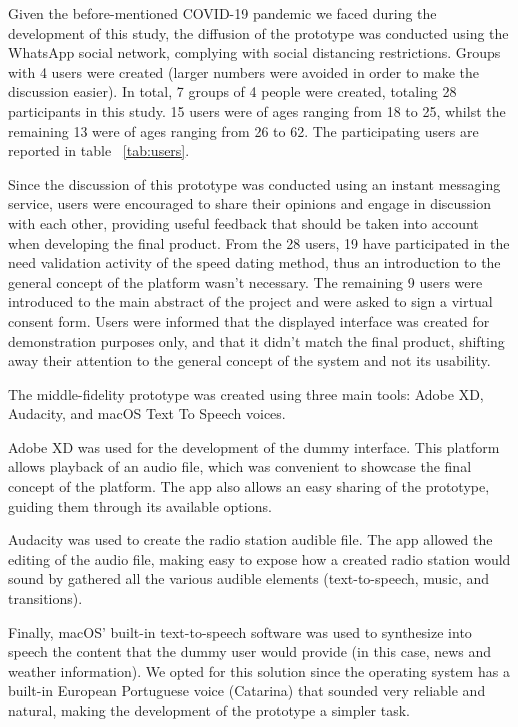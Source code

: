 Given the before-mentioned COVID-19 pandemic we faced during the development of this study, the diffusion of the prototype was conducted using the WhatsApp social network, complying with social distancing restrictions. Groups with 4 users were created (larger numbers were avoided in order to make the discussion easier). In total, 7 groups of 4 people were created, totaling 28 participants in this study. 15 users were of ages ranging from 18 to 25, whilst the remaining 13 were of ages ranging from 26 to 62. The participating users are reported in table ~\ref{tab:users}.

Since the discussion of this prototype was conducted using an instant messaging service, users were encouraged to share their opinions and engage in discussion with each other, providing useful feedback that should be taken into account when developing the final product. From the 28 users, 19 have participated in the need validation activity of the speed dating method, thus an introduction to the general concept of the platform wasn't necessary. The remaining 9 users were introduced to the main abstract of the project and were asked to sign a virtual consent form. Users were informed that the displayed interface was created for demonstration purposes only, and that it didn't match the final product, shifting away their attention to the general concept of the system and not its usability.

The middle-fidelity prototype was created using three main tools: Adobe XD, Audacity, and macOS Text To Speech voices. 

Adobe XD was used for the development of the dummy interface. This platform allows playback of an audio file, which was convenient to showcase the final concept of the platform. The app also allows an easy sharing of the prototype, guiding them through its available options. 

Audacity was used to create the radio station audible file. The app allowed the editing of the audio file, making easy to expose how a created radio station would sound by gathered all the various audible elements (text-to-speech, music, and transitions). 

Finally, macOS' built-in text-to-speech software was used to synthesize into speech the content that the dummy user would provide (in this case, news and weather information). We opted for this solution since the operating system has a built-in European Portuguese voice (Catarina) that sounded very reliable and natural, making the development of the prototype a simpler task.

